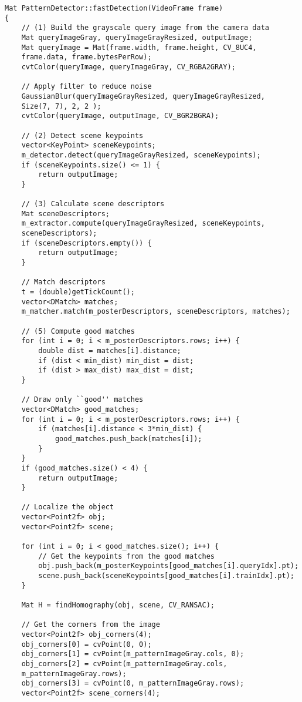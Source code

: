 \begin{verbatim}
Mat PatternDetector::fastDetection(VideoFrame frame)
{
    // (1) Build the grayscale query image from the camera data
    Mat queryImageGray, queryImageGrayResized, outputImage;
    Mat queryImage = Mat(frame.width, frame.height, CV_8UC4,
    frame.data, frame.bytesPerRow);
    cvtColor(queryImage, queryImageGray, CV_RGBA2GRAY);

    // Apply filter to reduce noise
    GaussianBlur(queryImageGrayResized, queryImageGrayResized, 
    Size(7, 7), 2, 2 );
    cvtColor(queryImage, outputImage, CV_BGR2BGRA);
    
    // (2) Detect scene keypoints
    vector<KeyPoint> sceneKeypoints;
    m_detector.detect(queryImageGrayResized, sceneKeypoints);
    if (sceneKeypoints.size() <= 1) {
        return outputImage;
    }
    
    // (3) Calculate scene descriptors
    Mat sceneDescriptors;
    m_extractor.compute(queryImageGrayResized, sceneKeypoints,
    sceneDescriptors);
    if (sceneDescriptors.empty()) {
        return outputImage;
    }
    
    // Match descriptors
    t = (double)getTickCount();
    vector<DMatch> matches;
    m_matcher.match(m_posterDescriptors, sceneDescriptors, matches);

    // (5) Compute good matches
    for (int i = 0; i < m_posterDescriptors.rows; i++) {
        double dist = matches[i].distance;
        if (dist < min_dist) min_dist = dist;
        if (dist > max_dist) max_dist = dist;
    }
    
    // Draw only ``good'' matches
    vector<DMatch> good_matches;
    for (int i = 0; i < m_posterDescriptors.rows; i++) {
        if (matches[i].distance < 3*min_dist) {
            good_matches.push_back(matches[i]);
        }
    }
    if (good_matches.size() < 4) {
        return outputImage;
    }
    
    // Localize the object
    vector<Point2f> obj;
    vector<Point2f> scene;
    
    for (int i = 0; i < good_matches.size(); i++) {
        // Get the keypoints from the good matches
        obj.push_back(m_posterKeypoints[good_matches[i].queryIdx].pt);
        scene.push_back(sceneKeypoints[good_matches[i].trainIdx].pt);
    }
    
    Mat H = findHomography(obj, scene, CV_RANSAC);
    
    // Get the corners from the image
    vector<Point2f> obj_corners(4);
    obj_corners[0] = cvPoint(0, 0);
    obj_corners[1] = cvPoint(m_patternImageGray.cols, 0);
    obj_corners[2] = cvPoint(m_patternImageGray.cols,
    m_patternImageGray.rows);
    obj_corners[3] = cvPoint(0, m_patternImageGray.rows);
    vector<Point2f> scene_corners(4);
    

\end{verbatim}
